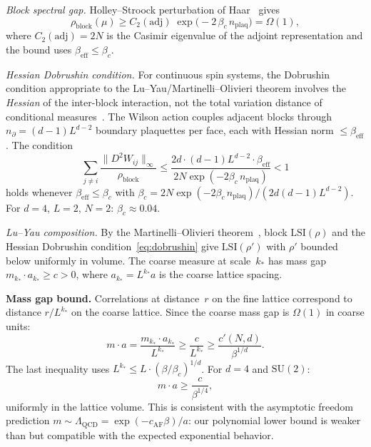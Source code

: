 \documentclass[11pt]{article}
\theoremstyle{definition}
\begin{document}
\emph{Block spectral gap.}  
Holley--Stroock perturbation of Haar~\cite{BGL} gives
\begin{equation}\label{eq:HS-strong}
  \rho_{\mathrm{block}}(\mu) \geq 
  C_2(\mathrm{adj})\;\exp\!\bigl(-2\,\beta_c\,n_{\mathrm{plaq}}\bigr) 
  = \Omega(1),
\end{equation}
where $C_2(\mathrm{adj}) = 2N$ is the Casimir eigenvalue of the 
adjoint representation and the bound uses 
$\beta_{\mathrm{eff}} \leq \beta_c$.

\emph{Hessian Dobrushin condition.}
For continuous spin systems, the Dobrushin condition appropriate 
to the Lu--Yau/Martinelli--Olivieri theorem involves the 
\emph{Hessian} of the inter-block interaction, not the total 
variation distance of conditional measures~\cite{martinelli_olivieri,BGL}.  
The Wilson action couples adjacent blocks through 
$n_\partial = (d{-}1)L^{d-2}$ boundary plaquettes per face, 
each with Hessian norm $\leq \beta_{\mathrm{eff}}$.  The condition 
\begin{equation}\label{eq:dobrushin}
  \sum_{j \neq i} \frac{\|D^2 W_{ij}\|_\infty}{\rho_{\mathrm{block}}} 
  \leq \frac{2d \cdot (d{-}1)L^{d-2} \cdot \beta_{\mathrm{eff}}}{2N 
  \exp(-2\beta_c \,n_{\mathrm{plaq}})} < 1
\end{equation}
holds whenever $\beta_{\mathrm{eff}} \leq \beta_c$ with 
$\beta_c = 2N \exp(-2\beta_c \, n_{\mathrm{plaq}}) 
/ (2d(d{-}1)L^{d-2})$.  For $d=4$, $L=2$, $N=2$: 
$\beta_c \approx 0.04$.

\emph{Lu--Yau composition.}  
By the Martinelli--Olivieri theorem~\cite{martinelli_olivieri}, 
block $\mathrm{LSI}(\rho)$ and the Hessian Dobrushin 
condition~\eqref{eq:dobrushin} give 
$\mathrm{LSI}(\rho')$ with $\rho'$ bounded below uniformly in 
volume.  The coarse measure at scale~$k_*$ has mass gap 
$m_{k_*} \cdot a_{k_*} \geq c > 0$, where $a_{k_*} = L^{k_*} a$ 
is the coarse lattice spacing.

\medskip
\textbf{Mass gap bound.}
Correlations at distance~$r$ on the fine lattice correspond to 
distance $r / L^{k_*}$ on the coarse lattice.  Since the coarse 
mass gap is $\Omega(1)$ in coarse units:
\begin{equation}\label{eq:mass_gap_bound}
  m \cdot a = \frac{m_{k_*} \cdot a_{k_*}}{L^{k_*}} 
  \geq \frac{c}{L^{k_*}} 
  \geq \frac{c'(N,d)}{\beta^{1/d}}.
\end{equation}
The last inequality uses $L^{k_*} \leq L \cdot (\beta/\beta_c)^{1/d}$.  
For $d = 4$ and $\mathrm{SU}(2)$:
\[
  m \cdot a \geq \frac{c}{\beta^{1/4}},
\]
uniformly in the lattice volume.  
This is consistent with the asymptotic freedom prediction 
$m \sim \Lambda_{\mathrm{QCD}} = \exp(-c_{\mathrm{AF}}\beta)/a$: 
our polynomial lower bound is weaker than but compatible with 
the expected exponential behavior.
\end{document}
